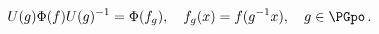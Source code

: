 \begin{equation}\label{phi_cov}
      U(g)\Phi(f)U(g)^{-1} = \Phi(f_g),\quad f_g(x)=f(g^{-1}x),\quad g\in\PGpo\,.
    \end{equation}


